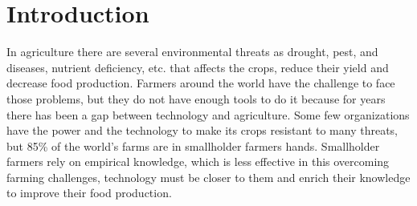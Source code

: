 \chapter{Introduction} %
\label{Chapter1}

In agriculture there are several environmental threats as drought, pest, and diseases, nutrient deficiency, etc. that affects the crops, reduce their yield and decrease food production. Farmers around the world have the challenge to face those problems, but they do not have enough tools to do it because for years there has been a gap between technology and agriculture. Some few organizations have the power and the technology to make its crops resistant to many threats, but 85\% of the world’s farms are in smallholder farmers hands\cite{nagayets2005small}. Smallholder farmers rely on empirical knowledge, which is less effective in this overcoming farming challenges\cite{hillnhuetter2008early}, technology must be closer to them and enrich their knowledge to improve their food production. 

